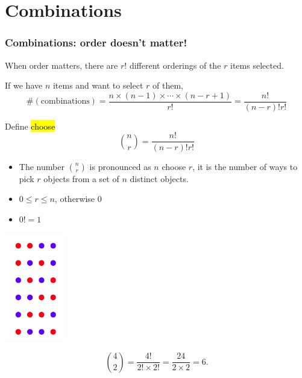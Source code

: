 \documentclass[slidestop,compress,mathserif]{beamer}
\begin{document}
\section{Combinations}
\begin{frame}[fragile]\frametitle{Combinations: order doesn't matter!}

\pause
When order matters, there are $r!$ different orderings of the $r$ items selected.

\begin{dinglist}{\DingListSymbolA}
\item If we have $n$ items and want to select $r$ of them,
\[
\#(\text{combinations}) = \frac{n \times (n-1) \times \cdots \times (n-r+1)}{r!} = \frac{n!}{(n-r)!r!}
\]

\pause
\item Define \hl{choose}
\[ {n \choose r} = \frac{n!}{(n-r)!r!}\]
\end{dinglist}

\pause
\begin{itemize}
\item The number ${n \choose r}$ is pronounced as $n$ choose $r$, it is the number of ways to pick
$r$ objects from a set of $n$ distinct objects.

\item $0 \leq r \leq n$, otherwise $0$
\pause
\item $0! = 1$
\end{itemize}

\end{frame}


\begin{frame}[fragile]%

\begin{center}
\includegraphics[width = 0.2\textwidth]{figures/marbles}
\end{center}

\[
{4 \choose 2} = \frac{4!}{2! \times 2!} = \frac{24}{2 \times 2} = 6.
\]

\end{frame}
\end{document}
